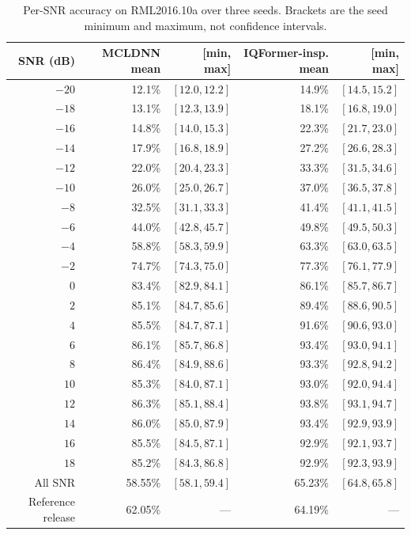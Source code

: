 \documentclass[letterpaper,onecolumn,11pt,journal]{IEEEtran}
\begin{document}
\begin{table}[t]
\centering
\caption{Per-SNR accuracy on RML2016.10a over three seeds. Brackets are the
seed minimum and maximum, not confidence intervals.}
\label{tab:e1s}
\footnotesize
\setlength{\tabcolsep}{3.4pt}
\begin{tabular}{rrrrr}
\toprule
SNR (dB) & MCLDNN mean & [min, max] & IQFormer-insp. mean & [min, max]\\
\midrule
$-20$ & 12.1\% & $[12.0,12.2]$ & 14.9\% & $[14.5,15.2]$\\
$-18$ & 13.1\% & $[12.3,13.9]$ & 18.1\% & $[16.8,19.0]$\\
$-16$ & 14.8\% & $[14.0,15.3]$ & 22.3\% & $[21.7,23.0]$\\
$-14$ & 17.9\% & $[16.8,18.9]$ & 27.2\% & $[26.6,28.3]$\\
$-12$ & 22.0\% & $[20.4,23.3]$ & 33.3\% & $[31.5,34.6]$\\
$-10$ & 26.0\% & $[25.0,26.7]$ & 37.0\% & $[36.5,37.8]$\\
$-8$ & 32.5\% & $[31.1,33.3]$ & 41.4\% & $[41.1,41.5]$\\
$-6$ & 44.0\% & $[42.8,45.7]$ & 49.8\% & $[49.5,50.3]$\\
$-4$ & 58.8\% & $[58.3,59.9]$ & 63.3\% & $[63.0,63.5]$\\
$-2$ & 74.7\% & $[74.3,75.0]$ & 77.3\% & $[76.1,77.9]$\\
$0$ & 83.4\% & $[82.9,84.1]$ & 86.1\% & $[85.7,86.7]$\\
$2$ & 85.1\% & $[84.7,85.6]$ & 89.4\% & $[88.6,90.5]$\\
$4$ & 85.5\% & $[84.7,87.1]$ & 91.6\% & $[90.6,93.0]$\\
$6$ & 86.1\% & $[85.7,86.8]$ & 93.4\% & $[93.0,94.1]$\\
$8$ & 86.4\% & $[84.9,88.6]$ & 93.3\% & $[92.8,94.2]$\\
$10$ & 85.3\% & $[84.0,87.1]$ & 93.0\% & $[92.0,94.4]$\\
$12$ & 86.3\% & $[85.1,88.4]$ & 93.8\% & $[93.1,94.7]$\\
$14$ & 86.0\% & $[85.0,87.9]$ & 93.4\% & $[92.9,93.9]$\\
$16$ & 85.5\% & $[84.5,87.1]$ & 92.9\% & $[92.1,93.7]$\\
$18$ & 85.2\% & $[84.3,86.8]$ & 92.9\% & $[92.3,93.9]$\\
\midrule
All SNR & 58.55\% & $[58.1,59.4]$ & 65.23\% & $[64.8,65.8]$\\
Reference release & 62.05\% & --- & 64.19\% & ---\\
\bottomrule
\end{tabular}
\end{table}
\end{document}
